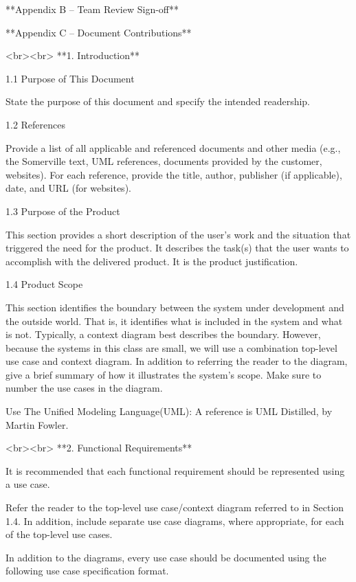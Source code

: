 \documentclass{article}
\begin{document}
**Appendix B -- Team Review Sign-off**

**Appendix C -- Document Contributions**

<br><br>
**1.  Introduction**

1.1  Purpose of This Document

State the purpose of this document and specify the intended readership.

1.2  References

Provide a list of all applicable and referenced documents and other media (e.g., the Somerville text, UML references, documents provided by the customer, websites).  For each reference, provide the title, author, publisher (if applicable), date, and URL (for websites).

1.3  Purpose of the Product

This section provides a short description of the user’s work and the situation that triggered the need for the product.  It describes the task(s) that the user wants to accomplish with the delivered product.  It is the product justification.

1.4  Product Scope

This section identifies the boundary between the system under development and the outside world.  That is, it identifies what is included in the system and what is not. Typically, a context diagram best describes the boundary.  However, because the systems in this class are small, we will use a combination top-level use case and context diagram.   In addition to referring the reader to the diagram, give a brief summary of how it illustrates the system’s scope.  Make sure to number the use cases in the diagram.

Use The Unified Modeling Language(UML):  A reference is UML Distilled, by Martin Fowler.

<br><br>
**2.  Functional Requirements**

It is recommended that each functional requirement should be represented using a use case.  

Refer the reader to the top-level use case/context diagram referred to in Section 1.4.  In addition, include separate use case diagrams, where appropriate, for each of the top-level use cases.

In addition to the diagrams, every use case should be documented using the following use case specification format.
\end{document}
